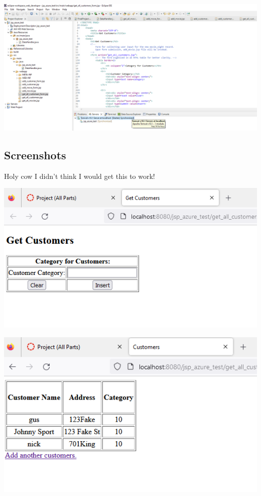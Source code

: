 \documentclass[11pt]{article}
\begin{document}

\includegraphics[width = \textwidth]{serverworking.png}

\subsection{Screenshots}
Holy cow I didn't think I would get this to work!

\includegraphics[width = \textwidth]{web1.png}

\includegraphics[width = \textwidth]{web2.png}
\end{document}
